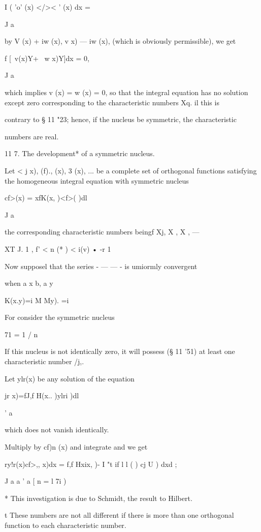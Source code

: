 {I ( 'o' (x) </>< ' (x) dx = 

J a 

by V (x) + iw (x), v  x) — iw (x), (which is obviously permissible), we get 

f [\ v(x)Y+ \ w x)Y]dx = 0, 

J a 

which implies v (x) = w (x) = 0, so that the integral equation has no solution 
except zero corresponding to the characteristic numbers Xq.  il this is 

contrary to § 11 "23; hence, if the nucleus be symmetric, the characteristic 

numbers are real. 

11 7. The development* of a symmetric nucleus. 

Let < j  x), (f)., (x),  3 (x), ... be a complete set of orthogonal functions 
satisfying the homogeneous integral equation with symmetric nucleus 

cf>(x) = xfK(x, )<f>( )dl 

J a 

the corresponding characteristic numbers beingf Xj, X , X , — 

XT J. 1 ,   f' < n (* ) <  i(v) • -r 1 

Now supposel that the series -  —  — -  is umiormly convergent 

when a x  b, a  y %

K(x.y)=i M My). 
 =i   

For consider the symmetric nucleus 

71 = 1 / n 

If this nucleus is not identically zero, it will possess (§ 11 '51) at least one 
characteristic number /j,. 

Let ylr(x) be any solution of the equation 

 jr x)=fJ,f H(x.. )ylri )dl 

' a 

which does not vanish identically. 

Multiply by cf)n (x) and integrate and we get 

ry!r(x)cf>,, x)dx = f,f Hxix, )- I "t if l l   ( ) cj U ) dxd ; 

J a   a ' a [ n = l  7i ) 

* This investigation is due to Schmidt, the result to Hilbert. 

t These numbers are not all different if there is more than one orthogonal function to each 
characteristic number. 

}
